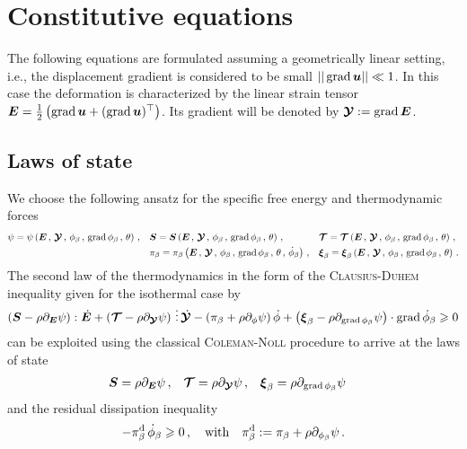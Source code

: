 \documentclass[preprint,review,3p,times,authoryear]{elsarticle}
\begin{document}
\section{Constitutive equations}
\label{sec:const-equat}
The following equations are formulated assuming a geometrically linear setting, i.e., the displacement gradient is considered to be small $||\operatorname*{grad}{\boldsymbol{u}}||\ll 1$. In this case the deformation is characterized by the linear strain tensor $\boldsymbol{E} = \frac{1}{2}\left( \operatorname*{grad}{\boldsymbol{u}} + (\operatorname*{grad}{\boldsymbol{u}})^{\top}\right)$. Its gradient will be denoted by $\boldsymbol{\mathcal{Y}} := \operatorname*{grad}\boldsymbol{E}$.

\subsection{Laws of state}
\label{sec:laws-state}
We choose the following ansatz for the specific free energy and thermodynamic forces
\begin{align*}
  & \psi = \psi\left( \tE\,,\,\ttY\,,\, \phi_{\beta}\,,\, \grad\phi_{\beta}\,,\,\theta \right)\,,
  && \tS = \tS\left( \tE\,,\,\ttY\,,\, \phi_{\beta}\,,\, \grad\phi_{\beta}\,,\,\theta \right)\,,
  && \ttT = \ttT\left( \tE\,,\,\ttY\,,\, \phi_{\beta}\,,\, \grad\phi_{\beta}\,,\,\theta \right)\,, \\
  &~
  && \pi_{\beta} = \pi_{\beta}\left( \tE\,,\,\ttY\,,\,\phi_{\beta}\,,\,\grad\phi_{\beta}\,,\,\theta\,,\,\sdot\phi_{\beta} \right)\,,
  && \vxi_{\beta} = \vxi_{\beta}\left( \tE\,,\,\ttY\,,\, \phi_{\beta}\,,\, \grad\phi_{\beta}\,,\,\theta \right)\,.
\end{align*}
The second law of the thermodynamics in the form of the \textsc{Clausius-Duhem} inequality given for the isothermal case by
\begin{equation}
  \label{eq:CD_inequality}
  \left( \tS - \rho\pder{\psi}{\tE} \right):\sdot\tE + \left( \ttT - \rho\pder{\psi}{\ttY} \right)\tridot\sdot\ttY - \left( \pi_{\beta} + \rho\pder{\psi}{\phi} \right)\sdot\phi + \left( \vxi_{\beta} - \rho\pder{\psi}{\grad\phi_{\beta}} \right)\cdot\grad\sdot\phi_{\beta} \geq 0
\end{equation}
can be exploited using the classical \textsc{Coleman-Noll} procedure to arrive at the laws of state
\begin{align}
  \label{eq:laws_of_state}
  & \boldsymbol{S}  = \rho\partial_{\boldsymbol{E}} \psi\,, && \boldsymbol{\mathcal{T}} = \rho\partial_{\boldsymbol{\mathcal{Y}}} \psi\,, && \boldsymbol{\xi}_{\beta} = \rho\partial_{\operatorname*{grad}\phi_{\beta}} \psi
\end{align}
and the residual dissipation inequality
\begin{align}
  \label{eq:res_dissipation}
  -\pi^{\ud}_{\beta}\,\sdot\phi_{\beta} \geq 0\,, \quad \text{with} \quad \pi^{\ud}_{\beta} := \pi_{\beta} + \rho\pder{\psi}{\phi_{\beta}}\,.
\end{align}
\end{document}
